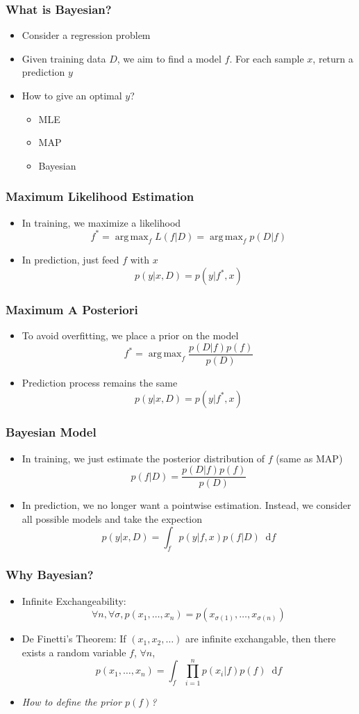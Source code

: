 \documentclass{beamer}
\DeclareMathOperator*{\argmax}{arg\,max}
\newcommand*\diff{\mathop{}\!\mathrm{d}}
\begin{document}
\begin{frame}
	\frametitle{What is Bayesian?}
	\begin{itemize}
		\item Consider a regression problem
		\item Given training data $D$, we aim to find a model $f$. For each sample $x$, return a prediction $y$
		\item How to give an optimal $y$?
		\begin{itemize}
			\pause
			\item MLE
			\item MAP
			\item Bayesian
		\end{itemize}
	\end{itemize}
\end{frame}
\begin{frame}
	\frametitle{Maximum Likelihood Estimation}
	\begin{itemize}
		\item In training, we maximize a likelihood
		\[
			f^* = \argmax_f L(f|D) = \argmax_f p(D|f)
		\]
		\item In prediction, just feed $f$ with $x$
		\[
			p(y|x, D)=p(y|f^*, x)
		\]
	\end{itemize}
\end{frame}
\begin{frame}
	\frametitle{Maximum A Posteriori}
	\begin{itemize}
		\item To avoid overfitting, we place a prior on the model
		\[
			f^* = \argmax_f \frac{p(D|f)p(f)}{p(D)}
		\]
		\item Prediction process remains the same
		\[
			p(y|x, D)=p(y|f^*, x)
		\]
	\end{itemize}
\end{frame}
\begin{frame}
	\frametitle{Bayesian Model}
	\begin{itemize}
		\item In training, we just estimate the posterior distribution of $f$ (same as MAP)
		\[
			p(f|D) = \frac{p(D|f)p(f)}{p(D)}
		\]
		\item In prediction, we no longer want a pointwise estimation. Instead, we consider all possible models and take the expection
		\[
			p(y|x, D)=\int_f p(y|f,x)p(f|D)\diff f
		\]
	\end{itemize}
\end{frame}
\begin{frame}
	\frametitle{Why Bayesian?}
	\begin{itemize}
		\item Infinite Exchangeability:
		\[
		\forall n, \forall \sigma, p(x_1, \ldots, x_n)=p(x_{\sigma(1)},\ldots, x_{\sigma(n)})
		\]
		\item De Finetti’s Theorem: If $(x_1, x_2, \ldots)$ are infinite exchangable, then there exists a random variable $f$, $\forall n$, 
		\[
		p(x_1, \ldots, x_n) = \int_{f} \prod_{i=1}^n p(x_i|f)p(f) \diff f
		\]
		\pause
		\item \em{How to define the prior $p(f)$}?
	\end{itemize}		
\end{frame}
\end{document}

